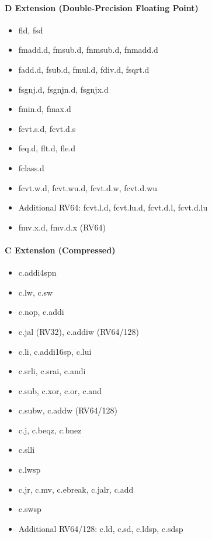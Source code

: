 \documentclass[]{article}
\providecommand{\tightlist}{%
  \setlength{\itemsep}{0pt}\setlength{\parskip}{0pt}}
\let\oldparagraph\paragraph
\renewcommand{\paragraph}[1]{\oldparagraph{#1}\mbox{}}
\begin{document}
\hypertarget{d-extension-double-precision-floating-point}{%
\paragraph{D Extension (Double-Precision Floating
Point)}\label{d-extension-double-precision-floating-point}}

\begin{itemize}
\tightlist
\item
  fld, fsd
\item
  fmadd.d, fmsub.d, fnmsub.d, fnmadd.d
\item
  fadd.d, fsub.d, fmul.d, fdiv.d, fsqrt.d
\item
  fsgnj.d, fsgnjn.d, fsgnjx.d
\item
  fmin.d, fmax.d
\item
  fcvt.s.d, fcvt.d.s
\item
  feq.d, flt.d, fle.d
\item
  fclass.d
\item
  fcvt.w.d, fcvt.wu.d, fcvt.d.w, fcvt.d.wu
\item
  Additional RV64: fcvt.l.d, fcvt.lu.d, fcvt.d.l, fcvt.d.lu
\item
  fmv.x.d, fmv.d.x (RV64)
\end{itemize}

\hypertarget{c-extension-compressed}{%
\paragraph{C Extension (Compressed)}\label{c-extension-compressed}}

\begin{itemize}
\tightlist
\item
  c.addi4spn
\item
  c.lw, c.sw
\item
  c.nop, c.addi
\item
  c.jal (RV32), c.addiw (RV64/128)
\item
  c.li, c.addi16sp, c.lui
\item
  c.srli, c.srai, c.andi
\item
  c.sub, c.xor, c.or, c.and
\item
  c.subw, c.addw (RV64/128)
\item
  c.j, c.beqz, c.bnez
\item
  c.slli
\item
  c.lwsp
\item
  c.jr, c.mv, c.ebreak, c.jalr, c.add
\item
  c.swsp
\item
  Additional RV64/128: c.ld, c.sd, c.ldsp, c.sdsp
\end{itemize}
\end{document}
